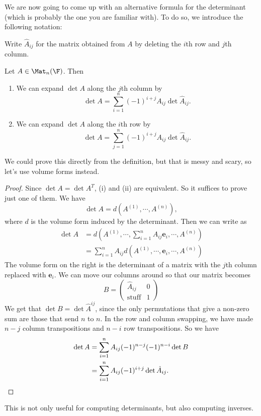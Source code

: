\documentclass[a4paper]{article}
\begin{document}
We are now going to come up with an alternative formula for the determinant (which is probably the one you are familiar with). To do so, we introduce the following notation:
\begin{notation}
  Write $\hat{A}_{ij}$ for the matrix obtained from $A$ by deleting the $i$th row and $j$th column.
\end{notation}

\begin{lemma}
  Let $A \in \Mat_n(\F)$. Then
  \begin{enumerate}
    \item We can expand $\det A$ along the $j$th column by
      \[
        \det A = \sum_{i = 1}^n (-1)^{i + j} A_{ij} \det \hat{A}_{ij}.
      \]
    \item We can expand $\det A$ along the $i$th row by
      \[
        \det A = \sum_{j = 1}^n (-1)^{i + j} A_{ij} \det \hat{A}_{ij}.
      \]
  \end{enumerate}
\end{lemma}
We could prove this directly from the definition, but that is messy and scary, so let's use volume forms instead.

\begin{proof}
  Since $\det A = \det A^T$, (i) and (ii) are equivalent. So it suffices to prove just one of them. We have
  \[
    \det A = d(A^{(1)}, \cdots, A^{(n)}),
  \]
  where $d$ is the volume form induced by the determinant. Then we can write as
  \begin{align*}
    \det A &= d\left(A^{(1)}, \cdots, \sum_{i = 1}^n A_{ij} \mathbf{e}_i, \cdots, A^{(n)}\right)\\
    &= \sum_{i = 1}^n A_{ij} d(A^{(1)}, \cdots, \mathbf{e}_i, \cdots, A^{(n)})
  \end{align*}
  The volume form on the right is the determinant of a matrix with the $j$th column replaced with $\mathbf{e}_i$. We can move our columns around so that our matrix becomes
  \[
    B =
    \begin{pmatrix}
      \hat{A}_{ij} & 0\\
      \mathrm{stuff} & 1
    \end{pmatrix}
  \]
  We get that $\det B = \det \hat{A}^{ij}$, since the only permutations that give a non-zero sum are those that send $n$ to $n$. In the row and column swapping, we have made $n - j$ column transpositions and $n - i$ row transpositions. So we have
  \begin{align*}
    \det A &= \sum_{i = 1}^n A_{ij} (-1)^{n - j} (-1)^{n - i}\det B\\
    &= \sum_{i = 1}^n A_{ij} (-1)^{i + j} \det \hat{A}_{ij}.\qedhere
  \end{align*}
\end{proof}
This is not only useful for computing determinants, but also computing inverses.
\end{document}
